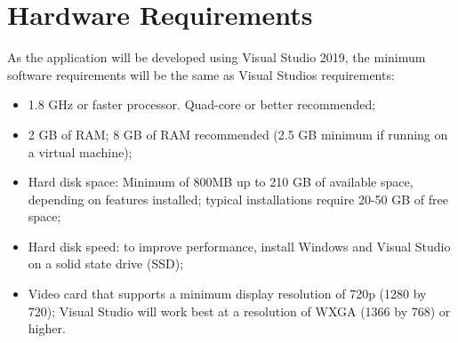 \section{Hardware Requirements}
As the application will be developed using Visual Studio 2019, the minimum software requirements will be the same as Visual Studios requirements:
\begin{itemize}
    \item 1.8 GHz or faster processor. Quad-core or better recommended;
    \item 2 GB of RAM; 8 GB of RAM recommended (2.5 GB minimum if running on a virtual machine);
    \item Hard disk space: Minimum of 800MB up to 210 GB of available space, depending on features installed; typical installations require 20-50 GB of free space;
    \item Hard disk speed: to improve performance, install Windows and Visual Studio on a solid state drive (SSD);
    \item Video card that supports a minimum display resolution of 720p (1280 by 720); Visual Studio will work best at a resolution of WXGA (1366 by 768) or higher.
\end{itemize}

